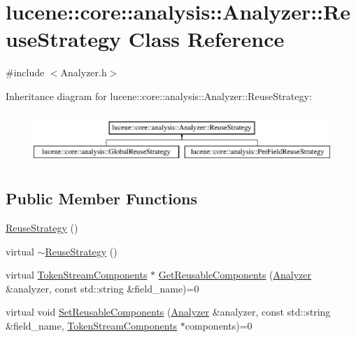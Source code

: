 \hypertarget{classlucene_1_1core_1_1analysis_1_1Analyzer_1_1ReuseStrategy}{}\section{lucene\+:\+:core\+:\+:analysis\+:\+:Analyzer\+:\+:Reuse\+Strategy Class Reference}
\label{classlucene_1_1core_1_1analysis_1_1Analyzer_1_1ReuseStrategy}


{\ttfamily \#include $<$Analyzer.\+h$>$}

Inheritance diagram for lucene\+:\+:core\+:\+:analysis\+:\+:Analyzer\+:\+:Reuse\+Strategy\+:\begin{figure}[H]
\begin{center}
\leavevmode
\includegraphics[height=1.951219cm]{classlucene_1_1core_1_1analysis_1_1Analyzer_1_1ReuseStrategy}
\end{center}
\end{figure}
\subsection*{Public Member Functions}
\begin{DoxyCompactItemize}
\item 
\mbox{\hyperlink{classlucene_1_1core_1_1analysis_1_1Analyzer_1_1ReuseStrategy_ac552252b82448b1e6012ff4024d99bfb}{Reuse\+Strategy}} ()
\item 
virtual \mbox{\hyperlink{classlucene_1_1core_1_1analysis_1_1Analyzer_1_1ReuseStrategy_ad113005e836ba6846d1fa2b6a1ae5924}{$\sim$\+Reuse\+Strategy}} ()
\item 
virtual \mbox{\hyperlink{classlucene_1_1core_1_1analysis_1_1TokenStreamComponents}{Token\+Stream\+Components}} $\ast$ \mbox{\hyperlink{classlucene_1_1core_1_1analysis_1_1Analyzer_1_1ReuseStrategy_ab180767950f392037e8ddf78c2f11f95}{Get\+Reusable\+Components}} (\mbox{\hyperlink{classlucene_1_1core_1_1analysis_1_1Analyzer}{Analyzer}} \&analyzer, const std\+::string \&field\+\_\+name)=0
\item 
virtual void \mbox{\hyperlink{classlucene_1_1core_1_1analysis_1_1Analyzer_1_1ReuseStrategy_a78a1328d5564e78e2168169b73094b23}{Set\+Reusable\+Components}} (\mbox{\hyperlink{classlucene_1_1core_1_1analysis_1_1Analyzer}{Analyzer}} \&analyzer, const std\+::string \&field\+\_\+name, \mbox{\hyperlink{classlucene_1_1core_1_1analysis_1_1TokenStreamComponents}{Token\+Stream\+Components}} $\ast$components)=0
\end{DoxyCompactItemize}


